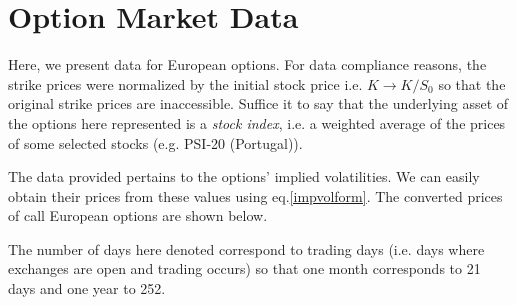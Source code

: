 
\chapter{Option Market Data}
\label{chapter:mktdata}

Here, we present data for European options. For data compliance reasons, the strike prices were normalized by the initial stock price i.e. $K\rightarrow K/S_0$ so that the original strike prices are inaccessible.
Suffice it to say that the underlying asset of the options here represented is a \emph{stock index}, i.e. a weighted average of the prices of some selected stocks (e.g. PSI-20 (Portugal)).

The data provided pertains to the options' implied volatilities. We can easily obtain their prices from these values using eq.\eqref{impvolform}. The converted prices of call European options are shown below.

The number of days here denoted correspond to trading days (i.e. days where exchanges are open and trading occurs) so that one month corresponds to 21 days and one year to 252.

